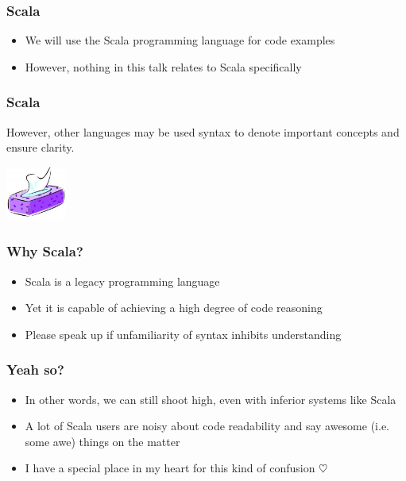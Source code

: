 \begin{frame}
\frametitle{Scala}
\begin{itemize}
  \item We will use the Scala programming language for code examples
  \item However, nothing in this talk relates to Scala specifically
\end{itemize}
\end{frame}

\begin{frame}
\frametitle{Scala}
\begin{center}
However, other languages may be used syntax to denote important concepts and ensure clarity.
\end{center}
\begin{center}
\includegraphics[height=1.8cm]{image/tissues.jpg}
\end{center}
\end{frame}

\begin{frame}
\frametitle{Why Scala?}
\begin{itemize}
  \item Scala is a legacy programming language
  \item Yet it is capable of achieving a high degree of code reasoning
  \item Please speak up if unfamiliarity of syntax inhibits understanding
\end{itemize}
\end{frame}

\begin{frame}
\frametitle{Yeah so?}
\begin{itemize}
  \item In other words, we can still shoot high, even with inferior systems like Scala
  \item A lot of Scala users are noisy about code readability and say awesome (i.e. some awe) things on the matter
  \item<2-> I have a special place in my heart for this kind of confusion $\heartsuit$
\end{itemize}
\end{frame}
